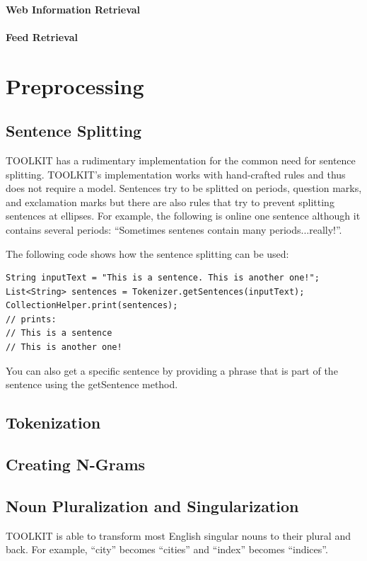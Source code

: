 \documentclass[a4paper,twoside]{book}      %
\begin{document}
\paragraph{Web Information Retrieval}
\paragraph{Feed Retrieval}

\section{Preprocessing}
\subsection{Sentence Splitting}
TOOLKIT has a rudimentary implementation for the common need for sentence splitting. TOOLKIT's implementation works with hand-crafted rules and thus does not require a model. Sentences try to be splitted on periods, question marks, and exclamation marks but there are also rules that try to prevent splitting sentences at ellipses. For example, the following is online one sentence although it contains several periods: ``Sometimes sentenes contain many periods...really!''.

The following code shows how the sentence splitting can be used:
\begin{codelisting}
\begin{lstlisting}[frame=tb]
String inputText = "This is a sentence. This is another one!";
List<String> sentences = Tokenizer.getSentences(inputText);
CollectionHelper.print(sentences);
// prints:
// This is a sentence
// This is another one!
\end{lstlisting}
\end{codelisting}

You can also get a specific sentence by providing a phrase that is part of the sentence using the getSentence method.

\subsection{Tokenization}
\subsection{Creating N-Grams}
\subsection{Noun Pluralization and Singularization}
TOOLKIT is able to transform most English singular nouns to their plural and back. For example, ``city'' becomes ``cities'' and ``index'' becomes ``indices''.
\end{document}
